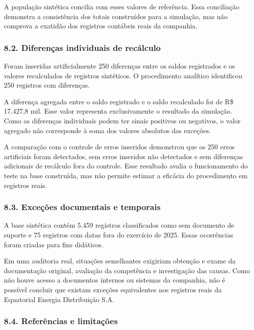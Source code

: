 \documentclass[
]{article}
\begin{document}
A população sintética concilia com esses valores de referência. Essa
conciliação demonstra a consistência dos totais construídos para a
simulação, mas não comprova a exatidão dos registros contábeis reais da
companhia.

\subsubsection{8.2. Diferenças individuais de
recálculo}\label{diferenuxe7as-individuais-de-recuxe1lculo-1}

Foram inseridas artificialmente 250 diferenças entre os saldos
registrados e os valores recalculados de registros sintéticos. O
procedimento analítico identificou 250 registros com diferenças.

A diferença agregada entre o saldo registrado e o saldo recalculado foi
de R\$ 17.427,8 mil. Esse valor representa exclusivamente o resultado da
simulação. Como as diferenças individuais podem ter sinais positivos ou
negativos, o valor agregado não corresponde à soma dos valores absolutos
das exceções.

A comparação com o controle de erros inseridos demonstrou que os 250
erros artificiais foram detectados, sem erros inseridos não detectados e
sem diferenças adicionais de recálculo fora do controle. Esse resultado
avalia o funcionamento do teste na base construída, mas não permite
estimar a eficácia do procedimento em registros reais.

\subsubsection{8.3. Exceções documentais e
temporais}\label{exceuxe7uxf5es-documentais-e-temporais-1}

A base sintética contém 5.459 registros classificados como sem documento
de suporte e 75 registros com datas fora do exercício de 2025. Essas
ocorrências foram criadas para fins didáticos.

Em uma auditoria real, situações semelhantes exigiriam obtenção e exame
da documentação original, avaliação da competência e investigação das
causas. Como não houve acesso a documentos internos ou sistemas da
companhia, não é possível concluir que existam exceções equivalentes nos
registros reais da Equatorial Energia Distribuição S.A.

\subsubsection{8.4. Referências e
limitações}\label{referuxeancias-e-limitauxe7uxf5es}
\end{document}
